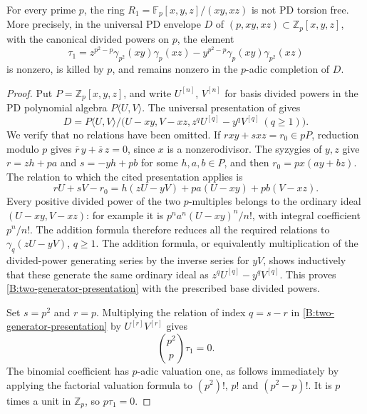 \begin{proposition}
\label{B:PD-two-generator-rejected}
For every prime $p$, the ring
$R_1=\mathbb F_p[x,y,z]/(xy,xz)$ is not PD torsion free.
More precisely, in the universal PD envelope $D$ of
$(p,xy,xz)\subset\mathbb Z_p[x,y,z]$, with the canonical divided
powers on $p$, the element
\[
 \tau_1=z^{p^2-p}\gamma_{p^2}(xy)\gamma_p(xz)
       -y^{p^2-p}\gamma_p(xy)\gamma_{p^2}(xz)
\]
is nonzero, is killed by $p$, and remains nonzero in the $p$-adic
completion of $D$.
\end{proposition}

\begin{proof}
Put $P=\mathbb Z_p[x,y,z]$, and write $U^{[n]}$, $V^{[n]}$ for
basis divided powers in the PD polynomial algebra $P\langle U,V\rangle$.
The universal presentation of \cite[Lemma 60.2.4, Tag 07HC]{B:StacksPDPresentation}
gives
\begin{equation}\label{B:two-generator-presentation}
 D=P\langle U,V\rangle/
 \bigl(U-xy,V-xz,z^qU^{[q]}-y^qV^{[q]}\ (q\geq1)\bigr).
\end{equation}
We verify that no relations have been omitted. If
$rxy+sxz=r_0\in pP$, reduction modulo $p$ gives
$\overline r\,y+\overline s\,z=0$, since $x$ is a nonzerodivisor.
The syzygies of $y,z$ give
$r=zh+pa$ and $s=-yh+pb$ for some $h,a,b\in P$, and then
$r_0=px(ay+bz)$. The relation to which the cited presentation applies is
\[
 rU+sV-r_0=h(zU-yV)+pa(U-xy)+pb(V-xz).
\]
Every positive divided power of the two $p$-multiples belongs to
the ordinary ideal $(U-xy,V-xz)$: for example it is
$p^na^n(U-xy)^n/n!$, with integral coefficient $p^n/n!$.
The addition formula therefore reduces all the required relations
to $\gamma_q(zU-yV)$, $q\geq1$. The addition formula, or equivalently
multiplication of the divided-power generating series by the inverse
series for $yV$, shows inductively that these generate the same
ordinary ideal as $z^qU^{[q]}-y^qV^{[q]}$. This proves
\eqref{B:two-generator-presentation} with the prescribed base divided powers.

Set $s=p^2$ and $r=p$. Multiplying the relation of index $q=s-r$
in \eqref{B:two-generator-presentation} by $U^{[r]}V^{[r]}$ gives
\[
 \binom{p^2}{p}\tau_1=0.
\]
The binomial coefficient has $p$-adic valuation one, as follows
immediately by applying the factorial valuation formula to
$(p^2)!$, $p!$ and $(p^2-p)!$. It is $p$ times a unit in
$\mathbb Z_p$, so $p\tau_1=0$.


\end{proof}
